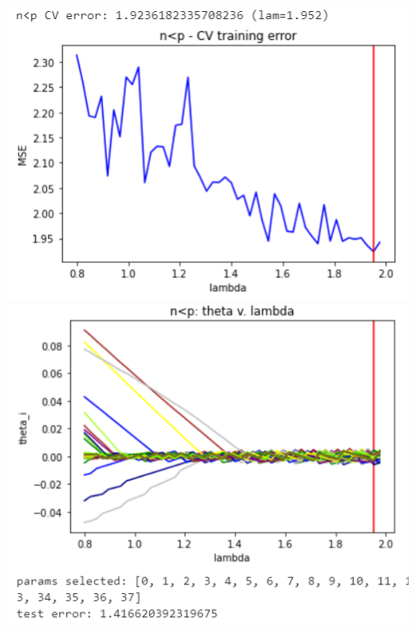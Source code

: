 \documentclass[11pt]{article}
\begin{document}
\begin{center}
\includegraphics[scale=0.7]{charts/bgd_corr_n_lt_p_err.PNG}
\includegraphics[scale=0.7]{charts/bgd_corr_n_lt_p_thetas.PNG}


\end{center}
\end{document}
